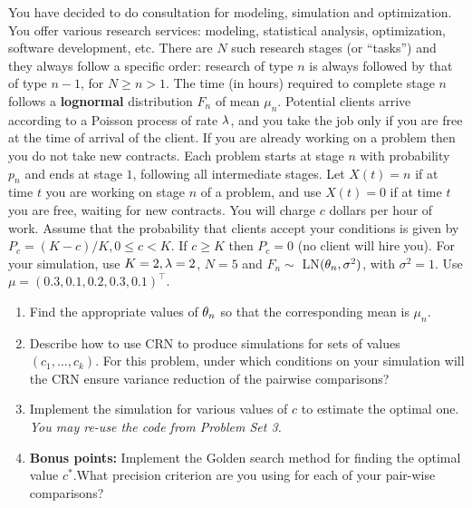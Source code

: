 \documentclass[12pt]{article}
\begin{document}
\begin{problem} 
You have decided to do consultation for modeling, simulation and
optimization. You offer various research  services: modeling,
statistical analysis, optimization, software development, etc. There are
$N$ such research stages (or ``tasks'') and they always follow a
specific order: research of type  $n$ is always followed  by that of
type $n-1$, for $N\ge n > 1$. The time (in hours) required to complete
stage $n$ follows a {\bfseries lognormal} distribution $F_n$ of mean
$\mu_n$. Potential clients arrive according to a Poisson process of rate
${\lambda}$, and you take the job only if you are free at the time of arrival
of the client. If you are already working on a problem then you do not
take new contracts. Each problem starts at stage $n$ with probability
$p_n$ and ends at stage $1$, following all  intermediate stages. Let
$X(t)=n$ if at time $t$ you are working on stage $n$ of a problem, and
use $X(t)=0$ if at time $t$ you are free, waiting for new contracts. You
will charge $c$ dollars per hour of work. Assume that the probability
that clients accept your conditions is given by $P_c=(K-c)/K, 0\le c
<K$. If $c\ge K$ then $P_c=0$ (no client will hire you). For your
simulation, use $K=2, {\lambda}=2$, $N=5$ and $F_n\sim$ LN$({\theta}_n,\sigma^2)$,
with $\sigma^2=1$. Use $\mu= (0.3,  0.1, 0.2, 0.3, 0.1)^\top$. 

\begin{enumerate}
\item  {} Find the appropriate values of ${\theta}_n$ so that the
    corresponding mean is $\mu_n$. 
\item {} Describe how to use CRN to produce simulations for sets
    of values $(c_1,\ldots, c_k)$. For this problem, under which
    conditions on your simulation will the CRN ensure variance reduction
    of the pairwise comparisons? 
\item  {} Implement the simulation for various values of $c$ to
    estimate the optimal one.  {\it You may re-use the code from Problem
    Set 3.} 
\item {\bfseries Bonus points:} Implement the Golden search method for
    finding the optimal value $c^*$.What precision criterion are you
    using for each of your pair-wise comparisons? 

\end{enumerate}

\end{problem}
\end{document}
